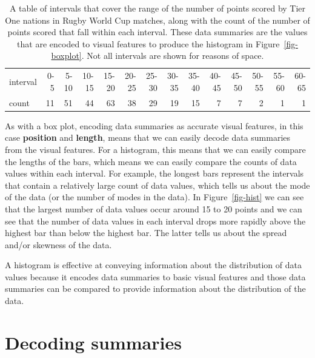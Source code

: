 \documentclass[
  letterpaper,
  DIV=11,
  numbers=noendperiod]{scrreprt}
\begin{document}
\begingroup\fontsize{8}{10}\selectfont

\begin{longtable}[t]{lrrrrrrrrrrrrr}

\caption{\label{tbl-hist-stats}A table of intervals that cover the range
of the number of points scored by Tier One nations in Rugby World Cup
matches, along with the count of the number of points scored that fall
within each interval. These data summaries are the values that are
encoded to visual features to produce the histogram in
Figure~\ref{fig-boxplot}. Not all intervals are shown for reasons of
space.}

\tabularnewline

\toprule
 &  &  &  &  &  &  &  &  &  &  &  &  & \\
\midrule
interval & 0-5 & 5-10 & 10-15 & 15-20 & 20-25 & 25-30 & 30-35 & 35-40 & 40-45 & 45-50 & 50-55 & 55-60 & 60-65\\
count & 11 & 51 & 44 & 63 & 38 & 29 & 19 & 15 & 7 & 7 & 2 & 1 & 1\\
\bottomrule

\end{longtable}

\endgroup{}

As with a box plot, encoding data summaries as accurate visual features,
in this case \textbf{position} and \textbf{length}, means that we can
easily decode data summaries from the visual features. For a histogram,
this means that we can easily compare the lengths of the bars, which
means we can easily compare the counts of data values within each
interval. For example, the longest bars represent the intervals that
contain a relatively large count of data values, which tells us about
the mode of the data (or the number of modes in the data). In
Figure~\ref{fig-hist} we can see that the largest number of data values
occur around 15 to 20 points and we can see that the number of data
values in each interval drops more rapidly above the highest bar than
below the highest bar. The latter tells us about the spread and/or
skewness of the data.

A histogram is effective at conveying information about the distribution
of data values because it encodes data summaries to basic visual
features and those data summaries can be compared to provide information
about the distribution of the data.

\section{Decoding summaries}\label{sec-summary-decode}
\end{document}
